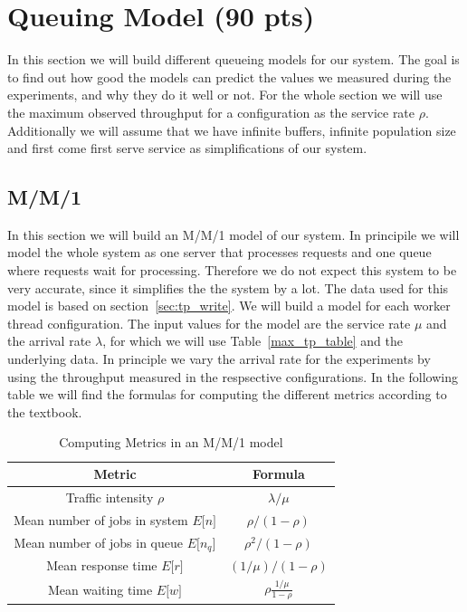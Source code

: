 \documentclass[11pt,a4paper]{article}
\newcommand{\expval}[1]{
	E\text{[}#1\text{]}
	}
\begin{document}
\section{Queuing Model (90 pts)}
%
In this section we will build different queueing models for our system.
%
The goal is to find out how good the models can predict the values we measured during the experiments, and why they do it well or not.
%
For the whole section we will use the maximum observed throughput for a configuration as the service rate $\rho$.
%
Additionally we will assume that we have infinite buffers, infinite population size and first come first serve service as simplifications of our system.
%
\subsection{M/M/1}
%
In this section we will build an M/M/1 model of our system. 
%
In principile we will model the whole system as one server that processes requests and one queue where requests wait for processing.
%
Therefore we do not expect this system to be very accurate, since it simplifies the the system by a lot.
%
The data used for this model is based on section~\ref{sec:tp_write}.
%
We will build a model for each worker thread configuration.
%
The input values for the model are the service rate $\mu$ and the arrival rate $\lambda$, for which we will use Table~\ref{max_tp_table} and the underlying data.
%
In principle we vary the arrival rate for the experiments by using the throughput measured in the respsective configurations.
%
In the following table we will find the formulas for computing the different metrics according to the textbook.
%
\begin{table}
	\centering
	\scriptsize{
	\def\arraystretch{1.25}
		\begin{tabular}{c|c}
			\textbf{Metric} & \textbf{Formula}\\
			\hline
			Traffic intensity $\rho$ & $\lambda / \mu$			\\
			Mean number of jobs in system $\expval{n}$ & $\rho/(1-\rho)$\\
			Mean number of jobs in queue $\expval{n_q}$ & $\rho^2/(1-\rho)$\\
			Mean response time $\expval{r}$ & $(1/\mu)/(1-\rho)$\\
			Mean waiting time $\expval{w}$ & $\rho\frac{1/\mu}{1-\rho}$\\
		\end{tabular}
		\caption{Computing Metrics in an M/M/1 model}
		\label{tab:mm1_deriv}	
	\def\arraystretch{1}
}
\end{table}	
\end{document}
